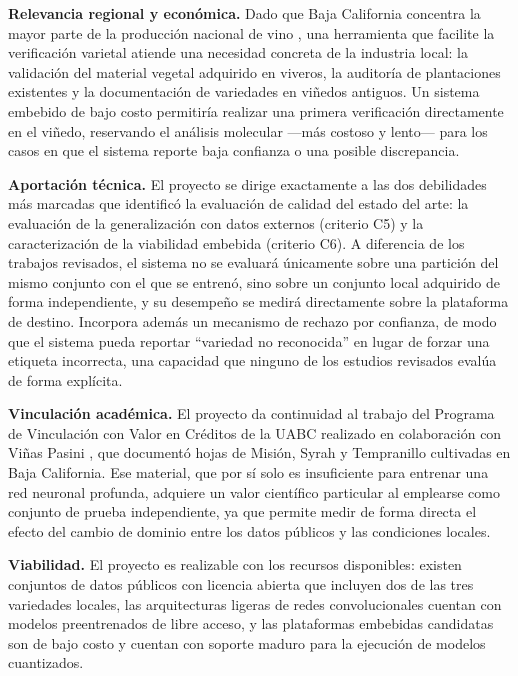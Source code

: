 \textbf{Relevancia regional y económica.} Dado que Baja California concentra
la mayor parte de la producción nacional de vino \citep{torres2024bc}, una
herramienta que facilite la verificación varietal atiende una necesidad
concreta de la industria local: la validación del material vegetal
adquirido en viveros, la auditoría de plantaciones existentes y la
documentación de variedades en viñedos antiguos. Un sistema embebido de
bajo costo permitiría realizar una primera verificación directamente en el
viñedo, reservando el análisis molecular —más costoso y lento— para los
casos en que el sistema reporte baja confianza o una posible discrepancia.

\textbf{Aportación técnica.} El proyecto se dirige exactamente a las dos
debilidades más marcadas que identificó la evaluación de calidad del estado
del arte: la evaluación de la generalización con datos externos (criterio
C5) y la caracterización de la viabilidad embebida (criterio C6). A
diferencia de los trabajos revisados, el sistema no se evaluará únicamente
sobre una partición del mismo conjunto con el que se entrenó, sino sobre un
conjunto local adquirido de forma independiente, y su desempeño se medirá
directamente sobre la plataforma de destino. Incorpora además un mecanismo
de rechazo por confianza, de modo que el sistema pueda reportar ``variedad
no reconocida'' en lugar de forzar una etiqueta incorrecta, una capacidad
que ninguno de los estudios revisados evalúa de forma explícita.

\textbf{Vinculación académica.} El proyecto da continuidad al trabajo del
Programa de Vinculación con Valor en Créditos de la UABC realizado en
colaboración con Viñas Pasini \citep{lopez2025pvvc}, que documentó hojas de
Misión, Syrah y Tempranillo cultivadas en Baja California. Ese material,
que por sí solo es insuficiente para entrenar una red neuronal profunda,
adquiere un valor científico particular al emplearse como conjunto de
prueba independiente, ya que permite medir de forma directa el efecto del
cambio de dominio entre los datos públicos y las condiciones locales.

\textbf{Viabilidad.} El proyecto es realizable con los recursos disponibles:
existen conjuntos de datos públicos con licencia abierta que incluyen dos de
las tres variedades locales, las arquitecturas ligeras de redes
convolucionales cuentan con modelos preentrenados de libre acceso, y las
plataformas embebidas candidatas son de bajo costo y cuentan con soporte
maduro para la ejecución de modelos cuantizados.

